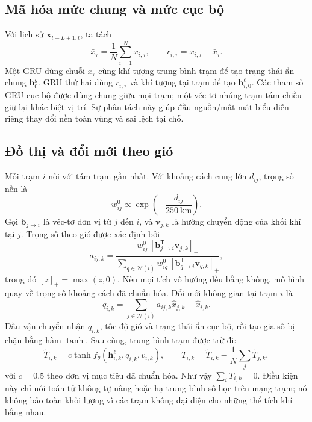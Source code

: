 \documentclass[10pt,a4paper]{article}
\begin{document}
\subsection{Mã hóa mức chung và mức cục bộ}

Với lịch sử $\bm{x}_{t-L+1:t}$, ta tách
\begin{equation}
  \bar{x}_{\tau}=\frac{1}{N}\sum_{i=1}^{N}x_{i,\tau},
  \qquad
  r_{i,\tau}=x_{i,\tau}-\bar{x}_{\tau}.
  \label{eq:common-local}
\end{equation}
Một GRU dùng chuỗi $\bar{x}_{\tau}$ cùng khí tượng trung bình trạm để tạo trạng thái ẩn chung $\bm{h}^{g}_0$. GRU thứ hai dùng $r_{i,\tau}$ và khí tượng tại trạm để tạo $\bm{h}^{\ell}_{i,0}$. Các tham số GRU cục bộ được dùng chung giữa mọi trạm; một véc-tơ nhúng trạm tám chiều giữ lại khác biệt vị trí. Sự phân tách này giúp đầu nguồn/mất mát biểu diễn riêng thay đổi nền toàn vùng và sai lệch tại chỗ.

\subsection{Đồ thị và đổi mới theo gió}

Mỗi trạm $i$ nối với tám trạm gần nhất. Với khoảng cách cung lớn $d_{ij}$, trọng số nền là
\begin{equation}
  w^{0}_{ij}\propto\exp\!\left(-\frac{d_{ij}}{250\ \mathrm{km}}\right).
  \label{eq:base-weight}
\end{equation}
Gọi $\bm{b}_{j\rightarrow i}$ là véc-tơ đơn vị từ $j$ đến $i$, và $\bm{v}_{j,k}$ là hướng chuyển động của khối khí tại $j$. Trọng số theo gió được xác định bởi
\begin{equation}
  a_{ij,k}
  = \frac{w^{0}_{ij}\,[\bm{b}_{j\rightarrow i}^{\mathsf T}\bm{v}_{j,k}]_+}
  {\sum_{q\in\mathcal{N}(i)}w^{0}_{iq}\,[\bm{b}_{q\rightarrow i}^{\mathsf T}\bm{v}_{q,k}]_+},
  \label{eq:wind-weight}
\end{equation}
trong đó $[z]_+=\max(z,0)$. Nếu mọi tích vô hướng đều bằng không, mô hình quay về trọng số khoảng cách đã chuẩn hóa. Đổi mới không gian tại trạm $i$ là
\begin{equation}
  q_{i,k}=\sum_{j\in\mathcal{N}(i)}a_{ij,k}\widehat{x}_{j,k}-\widehat{x}_{i,k}.
  \label{eq:innovation}
\end{equation}
Đầu vận chuyển nhận $q_{i,k}$, tốc độ gió và trạng thái ẩn cục bộ, rồi tạo gia số bị chặn bằng hàm $\tanh$. Sau cùng, trung bình trạm được trừ đi:
\begin{equation}
  \widetilde{T}_{i,k}=c\tanh f_{\theta}(\bm{h}^{\ell}_{i,k},q_{i,k},v_{i,k}),
  \qquad
  T_{i,k}=\widetilde{T}_{i,k}-\frac{1}{N}\sum_j\widetilde{T}_{j,k},
  \label{eq:transport}
\end{equation}
với $c=0.5$ theo đơn vị mục tiêu đã chuẩn hóa. Như vậy $\sum_iT_{i,k}=0$. Điều kiện này chỉ nói toán tử không tự nâng hoặc hạ trung bình số học trên mạng trạm; nó không bảo toàn khối lượng vì các trạm không đại diện cho những thể tích khí bằng nhau.
\end{document}
